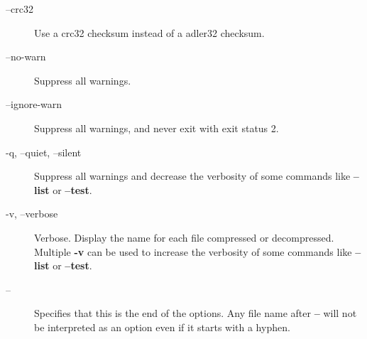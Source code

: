 \begin{description}
\item[{--crc32}] \mbox{}

Use a crc32 checksum instead of a adler32 checksum.


\item[{--no-warn}] \mbox{}

Suppress all warnings.


\item[{--ignore-warn}] \mbox{}

Suppress all warnings, and never exit with exit status 2.


\item[{-q, --quiet, --silent}] \mbox{}

Suppress all warnings and decrease the verbosity of some
commands like \textbf{--list} or \textbf{--test}.


\item[{-v, --verbose}] \mbox{}

Verbose. Display the name for each file compressed
or decompressed. Multiple \textbf{-v} can be used to increase
the verbosity of some commands like \textbf{--list} or \textbf{--test}.


\item[{--}] \mbox{}

Specifies that this is the end of the options. Any file name
after \textbf{--} will not be interpreted as an option even if
it starts with a hyphen.

\end{description}
